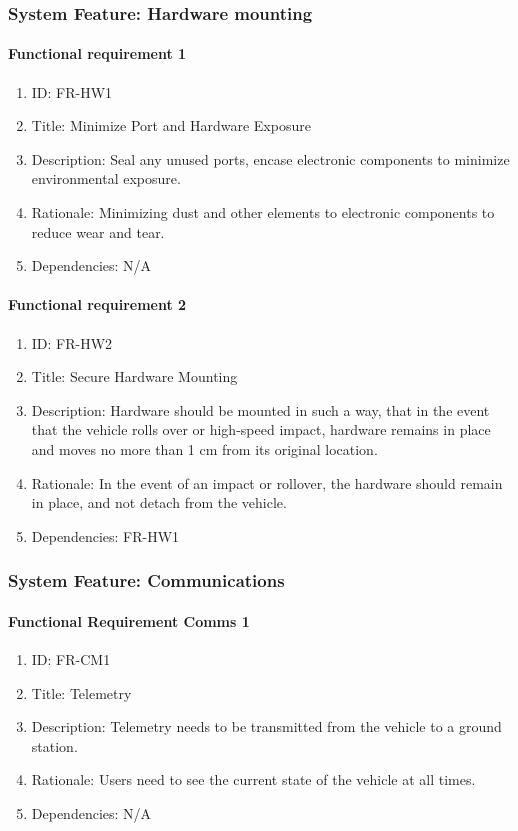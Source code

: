 \documentclass[compsoc,draftclsnofoot,onecolumn,10pt]{IEEEtran}
\begin{document}
\subsubsection{System Feature: Hardware mounting}
	\paragraph{Functional requirement 1}
		\begin{enumerate}
			\item ID: FR-HW1
			\item Title: Minimize Port and Hardware Exposure
			\item Description: Seal any unused ports, encase electronic components to minimize environmental exposure.
			\item Rationale: Minimizing dust and other elements to electronic components to reduce wear and tear.
			\item Dependencies: N/A
		\end{enumerate}

	\paragraph{ Functional requirement 2}
		\begin{enumerate}
			\item ID: FR-HW2
			\item Title: Secure Hardware Mounting
			\item Description: Hardware should be mounted in such a way, that in the event that the vehicle rolls over or high-speed impact, hardware remains in place and moves no more than 1 cm from its original location.
			\item Rationale: In the event of an impact or rollover, the hardware should remain in place, and not detach from the vehicle.
			\item Dependencies: FR-HW1
		\end{enumerate}



\subsubsection{System Feature: Communications}

	\paragraph{Functional Requirement Comms 1}
		\begin{enumerate}
			\item ID: FR-CM1
			\item Title: Telemetry
			\item Description: Telemetry needs to be transmitted from the vehicle to a ground station.
			\item Rationale: Users need to see the current state of the vehicle at all times.
			\item Dependencies: N/A
		\end{enumerate}
\end{document}
